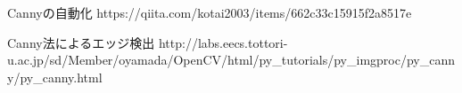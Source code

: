 Cannyの自動化
https://qiita.com/kotai2003/items/662c33c15915f2a8517e

Canny法によるエッジ検出
http://labs.eecs.tottori-u.ac.jp/sd/Member/oyamada/OpenCV/html/py_tutorials/py_imgproc/py_canny/py_canny.html

